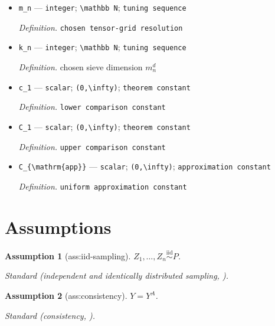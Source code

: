 \documentclass{article}
\newtheorem{assumption}{Assumption}
\begin{document}
\begin{itemize}
  \item \texttt{m\_\allowbreak{}n} --- \texttt{integer}; \texttt{\textbackslash{}\allowbreak{}mathbb N}; \texttt{tuning sequence}
  \par\smallskip\noindent\emph{Definition.} \texttt{chosen tensor-\allowbreak{}grid resolution}
  \item \texttt{k\_\allowbreak{}n} --- \texttt{integer}; \texttt{\textbackslash{}\allowbreak{}mathbb N}; \texttt{tuning sequence}
  \par\smallskip\noindent\emph{Definition.} chosen sieve dimension \(m_n^d\)
  \item \texttt{c\_\allowbreak{}1} --- \texttt{scalar}; \texttt{(0,\allowbreak{}\textbackslash{}\allowbreak{}infty)}; \texttt{theorem constant}
  \par\smallskip\noindent\emph{Definition.} \texttt{lower comparison constant}
  \item \texttt{C\_\allowbreak{}1} --- \texttt{scalar}; \texttt{(0,\allowbreak{}\textbackslash{}\allowbreak{}infty)}; \texttt{theorem constant}
  \par\smallskip\noindent\emph{Definition.} \texttt{upper comparison constant}
  \item \texttt{C\_\allowbreak{}\{\textbackslash{}\allowbreak{}mathrm\{app\}\allowbreak{}\}\allowbreak{}} --- \texttt{scalar}; \texttt{(0,\allowbreak{}\textbackslash{}\allowbreak{}infty)}; \texttt{approximation constant}
  \par\smallskip\noindent\emph{Definition.} \texttt{uniform approximation constant}
\end{itemize}

\section{Assumptions}

\begin{assumption}[ass:iid-sampling]\label{ass:iid-sampling}
\(Z_1,\ldots,Z_n\stackrel{\mathrm{iid}}{\sim}P\).
\par\smallskip\noindent\emph{Standard} (independent and identically distributed sampling, \cite{BonviniKennedyKeele2023MinimaxSubgroup}).
\end{assumption}

\begin{assumption}[ass:consistency]\label{ass:consistency}
\(Y=Y^A\).
\par\smallskip\noindent\emph{Standard} (consistency, \cite{BonviniKennedyKeele2023MinimaxSubgroup}).
\end{assumption}
\end{document}
